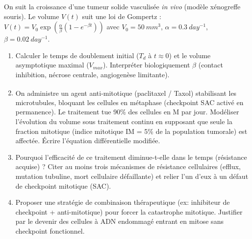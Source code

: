 \documentclass[11pt]{article}
\begin{document}
\begin{exercice}
On suit la croissance d'une tumeur solide vasculisée \textit{in vivo} (modèle xénogreffe souris). Le volume $V(t)$ suit une loi de Gompertz : $V(t) = V_0 \exp\left(\frac{\alpha}{\beta}(1-e^{-\beta t})\right)$ avec $V_0 = \SI{50}{mm^3}$, $\alpha = \SI{0,3}{day^{-1}}$, $\beta = \SI{0,02}{day^{-1}}$.
\begin{enumerate}
    \item Calculer le temps de doublement initial ($T_d$ à $t \approx 0$) et le volume asymptotique maximal ($V_{max}$). Interpréter biologiquement $\beta$ (contact inhibition, nécrose centrale, angiogenèse limitante).
    \item On administre un agent anti-mitotique (paclitaxel / Taxol\textsuperscript{\textregistered}) stabilisant les microtubules, bloquant les cellules en métaphase (checkpoint SAC activé en permanence). Le traitement tue 90\% des cellules en M par jour. Modéliser l'évolution du volume sous traitement continu en supposant que seule la fraction mitotique (indice mitotique IM = 5\% de la population tumorale) est affectée. Écrire l'équation différentielle modifiée.
    \item Pourquoi l'efficacité de ce traitement diminue-t-elle dans le temps (résistance acquise) ? Citer au moins trois mécanismes de résistance cellulaires (efflux, mutation tubuline, mort cellulaire défaillante) et relier l'un d'eux à un défaut de checkpoint mitotique (SAC).
    \item Proposer une stratégie de combinaison thérapeutique (ex: inhibiteur de checkpoint + anti-mitotique) pour forcer la catastrophe mitotique. Justifier par le devenir des cellules à ADN endommagé entrant en mitose sans checkpoint fonctionnel.
\end{enumerate}
\end{exercice}
\end{document}
